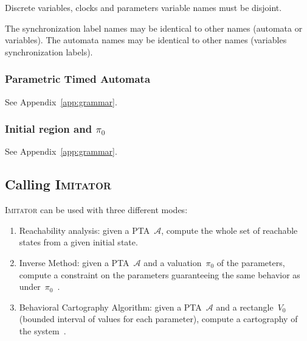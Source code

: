 \documentclass[a4paper,10pt]{article}
\newcommand{\A}{\mathcal{A}}
\newcommand{\hytech}{{\sc HyTech}}
\newcommand{\imitator}{\textsc{Imitator}}
\begin{document}

Discrete variables, clocks and parameters variable names must be disjoint.

The synchronization label names may be identical to other names (automata or variables).
The automata names may be identical to other names (variables synchronization labels).



\subsubsection{Parametric Timed Automata}

See Appendix~\ref{app:grammar}.

\subsubsection{Initial region and $\pi_0$}

See Appendix~\ref{app:grammar}.


\subsection{Calling \imitator}

\imitator{} can be used with three different modes:

\begin{enumerate}
	\item Reachability analysis: given a PTA~$\A$, compute the whole set of reachable states from a given initial state.
	\item Inverse Method: given a PTA~$\A$ and a valuation~$\pi_0$ of the parameters, compute a constraint on the parameters guaranteeing the same behavior as under~$\pi_0$~\cite{acef09}.
	\item Behavioral Cartography Algorithm: given a PTA~$\A$ and a rectangle~$V_0$ (bounded interval of values for each parameter), compute a cartography of the system~\cite{af10}.
\end{enumerate}
\end{document}
